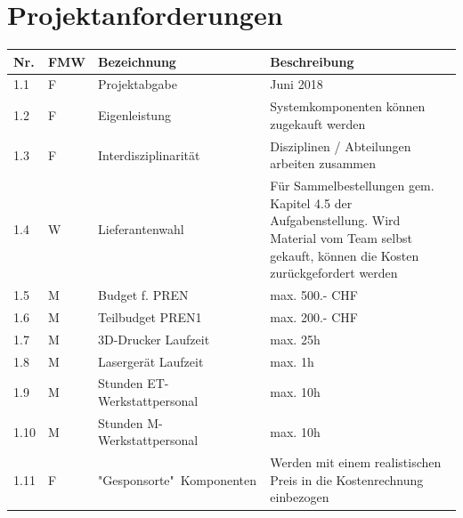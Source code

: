 \documentclass[a4paper]{report}
\begin{document}
\section{Projektanforderungen}
\label{app:sec:ProjektAnf}
\begin{tabular}{|p{}|p{}|p{}|p{}|}
	\hline
	\textbf{Nr.} & \textbf{FMW\footnotemark} & \textbf{Bezeichnung} & \textbf{Beschreibung} \\
	\hline
	1.1 & F & Projektabgabe & Juni 2018 \\
	\hline
	1.2 & F & Eigenleistung & Systemkomponenten können zugekauft werden \\
	\hline
	1.3 & F & Interdisziplinarität & Disziplinen / Abteilungen arbeiten zusammen \\
	\hline
	1.4 & W & Lieferantenwahl & Für Sammelbestellungen gem. Kapitel 4.5 der Aufgabenstellung. Wird Material vom Team selbst gekauft, können die Kosten zurückgefordert werden \\
	\hline
	1.5 & M & Budget f. PREN & max. 500.- CHF \\
	\hline
	1.6 & M & Teilbudget PREN1 & max. 200.- CHF \\
	\hline
	1.7 & M & 3D-Drucker Laufzeit & max. 25h \\
	\hline
	1.8 & M & Lasergerät Laufzeit & max. 1h \\
	\hline
	1.9 & M & Stunden ET-Werkstattpersonal & max. 10h \\
	\hline
	1.10 & M & Stunden M-Werkstattpersonal & max. 10h \\
	\hline
	1.11 & F & "Gesponsorte"\ Komponenten & Werden mit einem realistischen Preis in die Kostenrechnung einbezogen \\
	\hline
\end{tabular}
\end{document}
